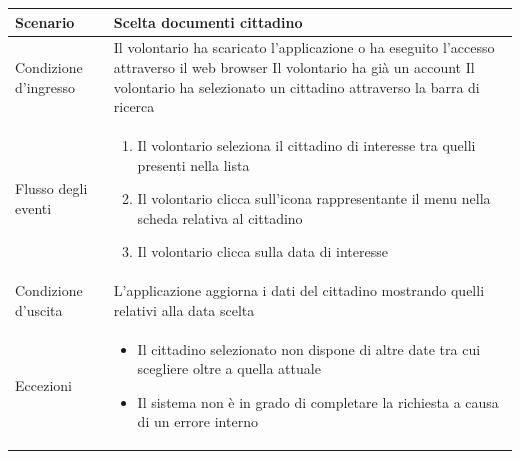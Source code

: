 \documentclass[12pt,a4paper,twoside,openright,titlepage]{book}
\begin{document}
\begin{table}[H]
\centering
\begin{tabular}{|p{4cm}|p{10cm}|}
\hline
Scenario & Scelta documenti cittadino \\
\hline
Condizione d'ingresso & Il volontario ha scaricato l'applicazione o ha eseguito l'accesso attraverso il web browser \newline
Il volontario ha già un account\newline
Il volontario ha selezionato un cittadino attraverso la barra di ricerca \\
\hline
Flusso degli eventi & 
\begin{enumerate}
\item Il volontario seleziona il cittadino di interesse tra quelli presenti nella lista
\item Il volontario clicca sull'icona rappresentante il menu nella scheda relativa al cittadino
\item Il volontario clicca sulla data di interesse
\end{enumerate}\\
\hline
Condizione d'uscita & L'applicazione aggiorna i dati del cittadino mostrando quelli relativi alla data scelta\\
\hline
Eccezioni & 
\begin{itemize}
\item Il cittadino selezionato non dispone di altre date tra cui scegliere oltre a quella attuale
\item Il sistema non è in grado di completare la richiesta a causa di un errore interno
\end{itemize} \\
\hline
\end{tabular}
\end{table}
\end{document}
